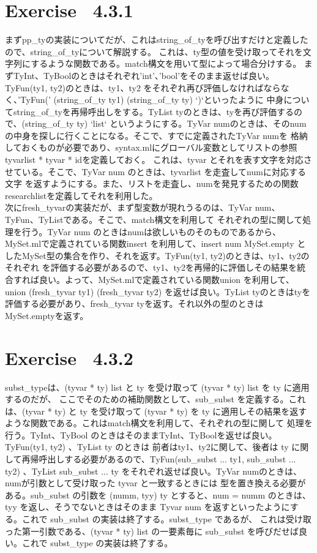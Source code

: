 \documentclass{jreport}
\begin{document}
\section{Exercise \ 4.3.1}
まずpp\_tyの実装についてだが、これはstring\_of\_tyを呼び出すだけと定義したので、string\_of\_tyについて解説する。
これは、ty型の値を受け取ってそれを文字列にするような関数である。match構文を用いて型によって場合分けする。
まずTyInt、TyBoolのときはそれぞれ'int'、'bool'をそのまま返せば良い。TyFun(ty1, ty2)のときは、ty1、ty2
をそれぞれ再び評価しなければならなく、'TyFun('  (string\_of\_ty ty1)  (string\_of\_ty ty) `)`といったように
中身についてstring\_of\_tyを再帰呼出しをする。TyList tyのときは、tyを再び評価するので、(string\_of\_ty ty) `list`
というようにする。TyVar numのときは、そのnumの中身を探しに行くことになる。そこで、すでに定義されたTyVar numを
格納しておくものが必要であり、syntax.mlにグローバル変数としてリストの参照tyvarlist * tyvar * idを定義しておく。
これは、tyvar とそれを表す文字を対応させている。そこで、TyVar num のときは、tyvarlist を走査してnumに対応する文字
を返すようにする。また、リストを走査し、numを発見するための関数researchlistを定義してそれを利用した。\\
次にfresh\_tyvarの実装だが、まず型変数が現れうるのは、TyVar num、TyFun、TyListである。そこで、match構文を利用して
それぞれの型に関して処理を行う。TyVar num のときはnumは欲しいものそのものであるから、MySet.mlで定義されている関数insert
を利用して、insert num MySet.empty としたMySet型の集合を作り、それを返す。TyFun(ty1, ty2)のときは、ty1、ty2のそれぞれ
を評価する必要があるので、ty1、ty2を再帰的に評価しその結果を統合すれば良い。よって、MySet.mlで定義されている関数union
を利用して、union (fresh\_tyvar ty1) (fresh\_tyvar ty2) を返せば良い。TyList tyのときはtyを評価する必要があり、fresh\_tyvar tyを返す。それ以外の型のときはMySet.emptyを返す。
\section{Exercise \ 4.3.2}
subst\_typeは、(tyvar * ty) list と ty を受け取って (tyvar * ty) list を ty に適用するのだが、
ここでそのための補助関数として、sub\_subst を定義する。これは、(tyvar * ty) と ty を受け取って
(tyvar * ty) を ty に適用しその結果を返すような関数である。これはmatch構文を利用して、それぞれの型に関して
処理を行う。TyInt、TyBool のときはそのままTyInt、TyBoolを返せば良い。TyFun(ty1, ty2) 、TyList ty のときは
前者はty1、ty2に関して、後者は ty に関して再帰呼出しする必要があるので、TyFun(sub\_subst ... ty1, sub\_subst ... ty2)
、TyList sub\_subst ... ty をそれぞれ返せば良い。TyVar numのときは、numが引数として受け取った tyvar と一致するときには
型を置き換える必要がある。sub\_subst の引数を (numm, tyy) ty とすると、num = numm のときは、tyy を返し、そうでないときはそのまま Tyvar num を返すといったようにする。これで sub\_subst の実装は終了する。subst\_type であるが、
これは受け取った第一引数である、(tyvar * ty) list の一要素毎に sub\_subst を呼びだせば良い。これで subst\_type の実装は終了する。
\end{document}
